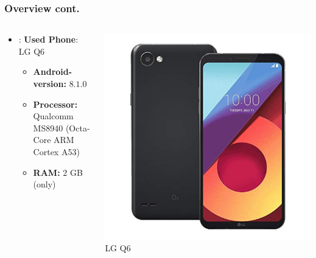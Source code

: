 \documentclass[aspectratio=169]{beamer}
\begin{document}
\begin{frame}
	\frametitle{Overview cont.}
	\begin{columns}[onlytextwidth]
		\begin{column}{0.75\textwidth}
			\begin{itemize}
				\item: \textbf{Used Phone}: LG Q6
				\begin{itemize}
					\item \textbf{Android-version:} $8.1.0$
					\item \textbf{Processor:} Qualcomm MS8940 (Octa-Core ARM Cortex A53)
					\item \textbf{RAM:} $2$ GB (only)
				\end{itemize} 
			\end{itemize}
		\end{column}
		\begin{column}{0.25\textwidth}
			\begin{center}
				\includegraphics[width=\textwidth]{phone.jpeg}\\
				LG Q6
			\end{center}
		\end{column}
	\end{columns}
\end{frame}
\end{document}
